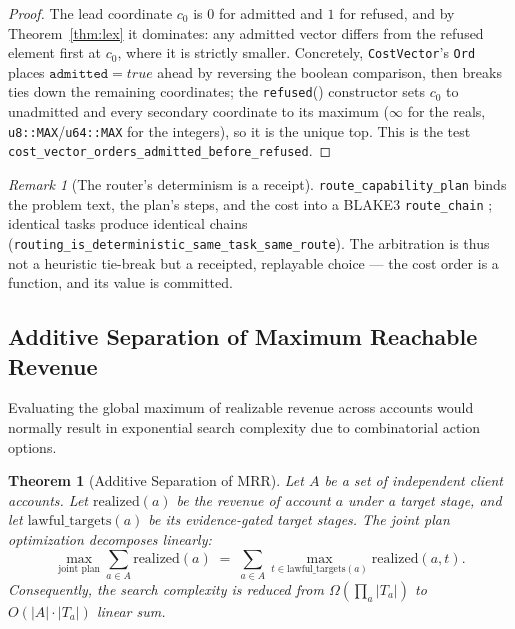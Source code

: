 \documentclass[11pt,oneside]{book}
\theoremstyle{definition}
\theoremstyle{plain}
\newtheorem{theorem}{Theorem}[chapter]
\theoremstyle{remark}
\newtheorem*{remark}{Remark}
\newcommand{\code}[1]{\texttt{#1}}
\begin{document}
\begin{proof}
The lead coordinate $c_0$ is $0$ for admitted and $1$ for refused, and by
Theorem~\ref{thm:lex} it dominates: any admitted vector differs from the refused element first
at $c_0$, where it is strictly smaller. Concretely, \code{CostVector}'s \code{Ord} places
$\code{admitted}=true$ ahead by reversing the boolean comparison, then breaks ties down the
remaining coordinates; the \code{refused}() constructor sets $c_0$ to unadmitted and every
secondary coordinate to its maximum ($\infty$ for the reals, \code{u8::MAX}/\code{u64::MAX} for
the integers), so it is the unique top. This is the test
\code{cost\_vector\_orders\_admitted\_before\_refused}. \end{proof}

\begin{remark}[The router's determinism is a receipt]
\code{route\_capability\_plan} binds the problem text, the plan's steps, and the cost into a
BLAKE3 \code{route\_chain} \cite{blake3}; identical tasks produce identical chains
(\code{routing\_is\_deterministic\_same\_task\_same\_route}). The arbitration is thus not a
heuristic tie-break but a receipted, replayable choice --- the cost order is a function, and its
value is committed.
\end{remark}

\subsection{Additive Separation of Maximum Reachable Revenue}

Evaluating the global maximum of realizable revenue across accounts would normally result in exponential search complexity due to combinatorial action options.

\begin{theorem}[Additive Separation of MRR]\label{thm:mrr}
Let $A$ be a set of independent client accounts. Let $\text{realized}(a)$ be the revenue of account $a$ under a target stage, and let $\text{lawful\_targets}(a)$ be its evidence-gated target stages.%
The joint plan optimization decomposes linearly:%
\begin{equation}\label{eq:mrr}
\max_{\text{joint plan}} \sum_{a\in A} \text{realized}(a)\;=\;\sum_{a\in A} \max_{t \in \text{lawful\_targets}(a)} \text{realized}(a, t).%
\end{equation}
Consequently, the search complexity is reduced from $\Omega(\prod_a |T_a|)$ to $O(|A|\cdot |T_a|)$ linear sum.%
\end{theorem}
\end{document}
